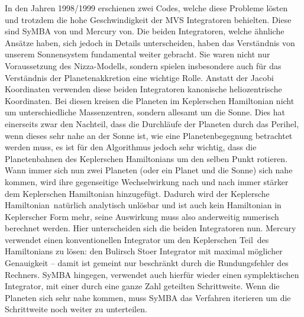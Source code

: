 \documentclass[12pt,a4paper,twoside]{article}
\renewcommand{\cite}{\citep}
\begin{document}
In den Jahren 1998/1999 erschienen zwei Codes, welche diese Probleme lösten und trotzdem die hohe Geschwindigkeit der MVS Integratoren behielten. Diese sind SyMBA von \cite{Duncan1998} und Mercury von\cite{Chambers1999}. Die beiden Integratoren, welche ähnliche Ansätze haben, sich jedoch in Details unterscheiden, haben das Verständnis von unserem Sonnensystem fundamental weiter gebracht. Sie waren nicht nur Voraussetzung des Nizza-Modells, sondern spielen insbesondere auch für das Verständnis der Planetenakkretion eine wichtige Rolle\cite{Morbidelli2002}.
Anstatt der Jacobi Koordinaten verwenden diese beiden Integratoren kanonische heliozentrische Koordinaten. Bei diesen kreisen die Planeten im Keplerschen Hamiltonian nicht um unterschiedliche Massenzentren, sondern allesamt um die Sonne. Dies hat einerseits zwar den Nachteil, dass die Durchläufe der Planeten durch das Perihel, wenn dieses sehr nahe an der Sonne ist, wie eine Planetenbegegnung betrachtet werden muss, es ist für den Algorithmus jedoch sehr wichtig, dass die Planetenbahnen des Keplerschen Hamiltonians um den selben Punkt rotieren\cite{Morbidelli2002}.
Wann immer sich nun zwei Planeten (oder ein Planet und die Sonne) sich nahe kommen, wird ihre gegenseitige Wechselwirkung nach und nach immer stärker dem Keplerschen Hamiltonian hinzugefügt\cite{Morbidelli2002}.
Dadurch wird der \glqq Keplersche Hamiltonian\grqq\  natürlich analytisch unlösbar und ist auch kein Hamiltonian in Keplerscher Form mehr, seine Auswirkung muss also anderweitig numerisch berechnet werden.
Hier unterscheiden sich die beiden Integratoren nun. Mercury verwendet einen konventionellen Integrator um den \glqq Keplerschen Teil\grqq\  des Hamiltonians zu lösen: den Bulirsch Stoer Integrator mit maximal möglicher Genauigkeit – damit ist gemeint nur beschränkt durch die Rundungsfehler des Rechners\cite{Chambers1999,Morbidelli2002}.
SyMBA hingegen, verwendet auch hierfür wieder einen symplektischen Integrator, mit einer durch eine ganze Zahl geteilten Schrittweite. Wenn die Planeten sich sehr nahe kommen, muss SyMBA das Verfahren iterieren um die Schrittweite noch weiter zu unterteilen\cite{Duncan1998,Morbidelli2002}.

\FloatBarrier
\end{document}
